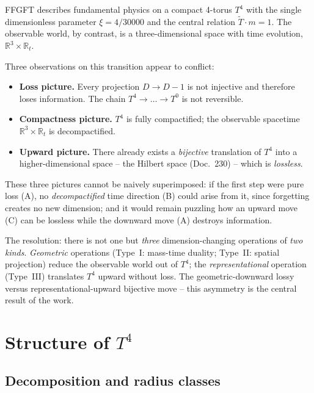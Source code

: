 FFGFT describes fundamental physics on a compact 4-torus $T^4$ with the single
dimensionless parameter $\xi = 4/30000$ and the central relation
$\tilde{T}\cdot m = 1$. The observable world, by contrast, is a
three-dimensional space with time evolution, $\mathbb{R}^3 \times \mathbb{R}_t$.

Three observations on this transition appear to conflict:
\begin{itemize}
  \item[(A)] \textbf{Loss picture.} Every projection $D{\to}D{-}1$ is not
  injective and therefore loses information. The chain $T^4 \to \dots \to T^0$
  is not reversible.
  \item[(B)] \textbf{Compactness picture.} $T^4$ is fully compactified; the
  observable spacetime $\mathbb{R}^3 \times \mathbb{R}_t$ is decompactified.
  \item[(C)] \textbf{Upward picture.} There already exists a \emph{bijective}
  translation of $T^4$ into a higher-dimensional space -- the Hilbert space
  (Doc.~230) -- which is \emph{lossless}.
\end{itemize}

These three pictures cannot be naively superimposed: if the first step were pure
loss (A), no \emph{decompactified} time direction (B) could arise from it, since
forgetting creates no new dimension; and it would remain puzzling how an upward
move (C) can be lossless while the downward move (A) destroys information.

The resolution: there is not one but \emph{three} dimension-changing operations
of \emph{two kinds}. \emph{Geometric} operations (Type~I: mass-time duality;
Type~II: spatial projection) reduce the observable world out of $T^4$; the
\emph{representational} operation (Type~III) translates $T^4$ upward without
loss. The geometric-downward lossy versus representational-upward bijective
move -- this asymmetry is the central result of the work.

\section{Structure of $T^4$}

\subsection{Decomposition and radius classes}

